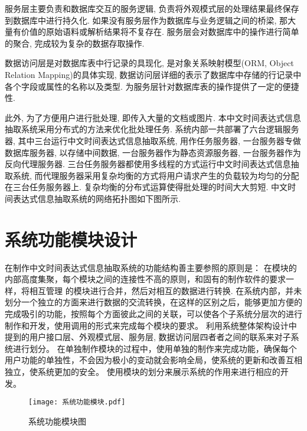 服务层主要负责和数据库交互的服务逻辑, 负责将外观模式层的处理结果最终保存到数据库中进行持久化.
如果没有服务层作为数据库与业务逻辑之间的桥梁, 那大量有价值的原始语料或解析结果将不复存在.
服务层会对数据库中的操作进行简单的聚合, 完成较为复杂的数据存取操作.

数据访问层是对数据库表中行记录的具现化, 是对象关系映射模型(ORM, Object Relation Mapping)的具体实现, 数据访问层详细的表示了数据库中存储的行记录中各个字段或属性的名称以及类型.
为服务层针对数据库表的操作提供了一定的便捷性.

此外, 为了方便用户进行批处理, 即传入大量的文档或图片. 本中文时间表达式信息抽取系统采用分布式的方法来优化批处理任务.
系统内部一共部署了六台逻辑服务器, 其中三台运行中文时间表达式信息抽取系统, 用作任务服务器, 一台服务器专做数据库服务器, 以存储中间数据, 一台服务器作为静态资源服务器, 一台服务器作为反向代理服务器.
三台任务服务器都使用多线程的方式运行中文时间表达式信息抽取系统, 而代理服务器采用复杂均衡的方式将用户请求产生的负载较为均匀的分配在三台任务服务器上. 复杂均衡的分布式运算使得批处理的时间大大剪短.
中文时间表达式信息抽取系统的网络拓扑图如下图所示.


\section{系统功能模块设计}

在制作中文时间表达式信息抽取系统的功能结构善主要参照的原则是：
在模块的内部高度集聚，每个模块之间的连接性不高的原则，和固有的制作软件的要求一样，将相互管理
的模块进行合并，然后对相互的数据进行转换.
在系统内部，并未划分一个独立的方面来进行数据的交流转换，在这样的区别之后，能够更加方便的完成吸引的功能，按照每个方面彼此之间的关联，可以使各个子系统分层次的进行制作和开发，使用调用的形式来完成每个模块的要求。
利用系统整体架构设计中提到的用户接口层、外观模式层、服务层, 数据访问层四者者之间的联系来对子系统进行划分。
在单独制作模块的过程中，使用单独的制作来完成功能，确保每个用户功能的单独性，不会因为极小的变动就会影响全局，使系统的更新和改善互相独立，使系统更加的安全。
使用模块的划分来展示系统的作用来进行相应的开发。







\begin{figure}[h]
  \centering
  \texttt{[image: 系统功能模块.pdf]}
  \caption{系统功能模块图}
  \label{fig:badge}
\end{figure}



